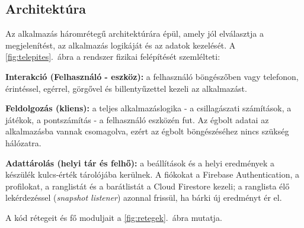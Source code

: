 \documentclass[12pt,a4paper]{article}
\begin{document}
\subsection{Architektúra}

Az alkalmazás háromrétegű architektúrára épül, amely jól elválasztja a megjelenítést, az
alkalmazás logikáját és az adatok kezelését. A \ref{fig:telepites}.~ábra a rendszer fizikai
felépítését szemlélteti:

\textbf{Interakció (Felhasználó - eszköz):} a felhasználó böngészőben vagy telefonon, érintéssel,
egérrel, görgővel és billentyűzettel kezeli az alkalmazást.

\textbf{Feldolgozás (kliens):} a teljes alkalmazáslogika - a csillagászati számítások, a
játékok, a pontszámítás - a felhasználó eszközén fut. Az égbolt adatai az alkalmazásba vannak
csomagolva, ezért az égbolt böngészéséhez nincs szükség hálózatra.

\textbf{Adattárolás (helyi tár és felhő):} a beállítások és a helyi eredmények a készülék
kulcs-érték tárolójába kerülnek. A fiókokat a Firebase Authentication, a profilokat, a
ranglistát és a barátlistát a Cloud Firestore kezeli; a ranglista élő lekérdezéssel
(\emph{snapshot listener}) azonnal frissül, ha bárki új eredményt ér el.

A kód rétegeit és fő moduljait a \ref{fig:retegek}.~ábra mutatja.
\end{document}
